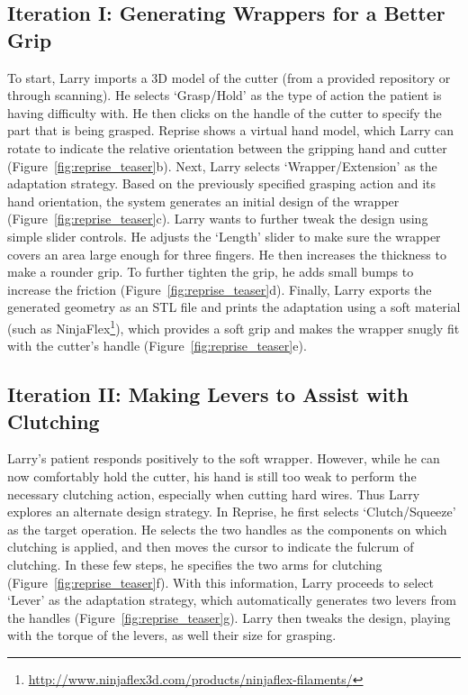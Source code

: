 \subsection{Iteration I: Generating Wrappers for a Better Grip}
To start, Larry imports a 3D model of the cutter (from a provided repository or through scanning). He selects `Grasp/Hold' as the type of action the patient is having difficulty with. He then clicks on the handle of the cutter to specify the part that is being grasped. Reprise shows a virtual hand model, which Larry can rotate to indicate the relative orientation between the gripping hand and cutter (Figure~\ref{fig:reprise_teaser}b). Next, Larry selects `Wrapper/Extension' as the adaptation strategy. Based on the previously specified grasping action and its hand orientation, the system generates an initial design of the wrapper (Figure~\ref{fig:reprise_teaser}c). Larry wants to further tweak the design using simple slider controls. He adjusts the `Length' slider to make sure the wrapper covers an area large enough for three fingers. He then increases the thickness to make a rounder grip. To further tighten the grip, he adds small bumps to increase the friction (Figure~\ref{fig:reprise_teaser}d). Finally, Larry exports the generated geometry as an STL file and prints the adaptation using a soft material (such as NinjaFlex\footnote{\url{http://www.ninjaflex3d.com/products/ninjaflex-filaments/}}), which provides a soft grip and makes the wrapper snugly fit with the cutter's handle (Figure~\ref{fig:reprise_teaser}e).

\subsection{Iteration II: Making Levers to Assist with Clutching}
Larry's patient responds positively to the soft wrapper. However, while he can now comfortably hold the cutter, his hand is still too weak to perform the necessary clutching action, especially when cutting hard wires. Thus Larry explores an alternate design strategy. In Reprise, he first selects `Clutch/Squeeze' as the target operation. He selects the two handles as the components on which clutching is applied, and then moves the cursor to indicate the fulcrum of clutching. In these few steps, he specifies the two arms for clutching (Figure~\ref{fig:reprise_teaser}f). With this information, Larry proceeds to select `Lever' as the adaptation strategy, which automatically generates two levers from the handles (Figure~\ref{fig:reprise_teaser}g). Larry then tweaks the design, playing with the torque of the levers, as well their size for grasping.

